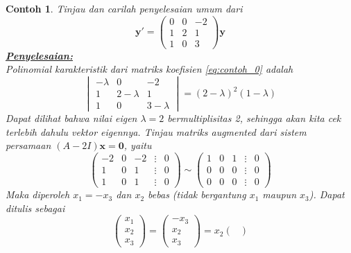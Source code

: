 \documentclass[a4paper]{article}
\theoremstyle{definisi}
\newtheorem{contoh}{Contoh}[section]
\newcommand{\penyelesaian}{\textbf{\underline{Penyelesaian:}}\\}
\numberwithin{equation}{section}
\begin{document}
  \begin{contoh}
    Tinjau dan carilah penyelesaian umum dari
    \begin{equation}\label{eq:contoh_0}
      \mathbf{y'}=\begin{pmatrix}
        0&0&-2\\
        1&2&1\\
        1&0&3
      \end{pmatrix}\mathbf{y}
    \end{equation}
    \penyelesaian
    Polinomial karakteristik dari matriks koefisien \eqref{eq:contoh_0} adalah
    \begin{equation*}
      \begin{vmatrix}
        -\lambda&0&-2\\
        1&2-\lambda&1\\
        1&0&3-\lambda
      \end{vmatrix}=(2-\lambda)^2(1-\lambda)
    \end{equation*}
    Dapat dilihat bahwa nilai eigen $\lambda=2$ bermultiplisitas 2, sehingga akan kita cek terlebih dahulu vektor eigennya. Tinjau matriks \textit{augmented} dari sistem persamaan $(A-2I)\mathbf{x}=\mathbf{0}$, yaitu
    \begin{equation*}
      \begin{pmatrix}
        -2&0&-2&\vdots&0\\
        1&0&1&\vdots&0\\
        1&0&1&\vdots&0
      \end{pmatrix}\sim
      \begin{pmatrix}
        1&0&1&\vdots&0\\
        0&0&0&\vdots&0\\
        0&0&0&\vdots&0
      \end{pmatrix}
    \end{equation*}
    Maka diperoleh $x_1=-x_3$ dan $x_2$ bebas (tidak bergantung $x_1$ maupun $x_3$). Dapat ditulis sebagai
    \begin{equation}\label{eq:contoh_0_bebas_linear}
      \begin{pmatrix}
        x_1\\x_2\\x_3
      \end{pmatrix}=\begin{pmatrix}
        -x_3\\x_2\\x_3
      \end{pmatrix}=x_2\begin{pmatrix}

\end{pmatrix}
\end{equation}
\end{contoh}
\end{document}

